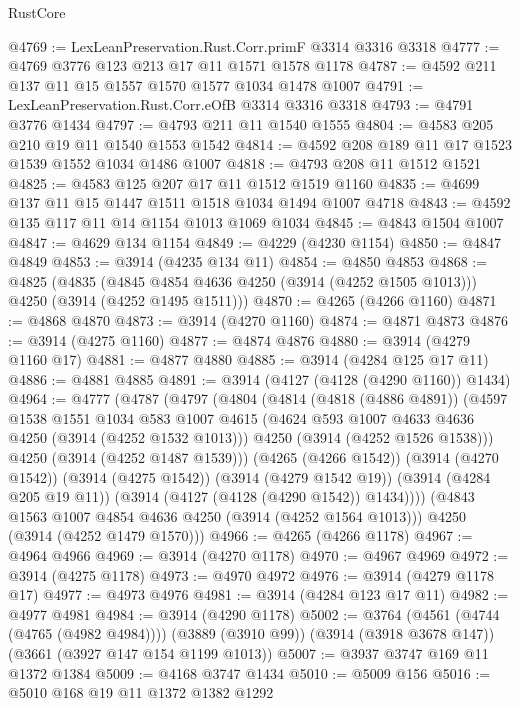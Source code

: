 \begin{lexlean}{RustCore}
\begin{coremodule}
@4769 := LexLeanPreservation.Rust.Corr.primF @3314 @3316 @3318
@4777 := @4769 @3776 @123 @213 @17 @11 @1571 @1578 @1178
@4787 := @4592 @211 @137 @11 @15 @1557 @1570 @1577 @1034 @1478 @1007
@4791 := LexLeanPreservation.Rust.Corr.eOfB @3314 @3316 @3318
@4793 := @4791 @3776 @1434
@4797 := @4793 @211 @11 @1540 @1555
@4804 := @4583 @205 @210 @19 @11 @1540 @1553 @1542
@4814 := @4592 @208 @189 @11 @17 @1523 @1539 @1552 @1034 @1486 @1007
@4818 := @4793 @208 @11 @1512 @1521
@4825 := @4583 @125 @207 @17 @11 @1512 @1519 @1160
@4835 := @4699 @137 @11 @15 @1447 @1511 @1518 @1034 @1494 @1007 @4718
@4843 := @4592 @135 @117 @11 @14 @1154 @1013 @1069 @1034
@4845 := @4843 @1504 @1007
@4847 := @4629 @134 @1154
@4849 := @4229 (@4230 @1154)
@4850 := @4847 @4849
@4853 := @3914 (@4235 @134 @11)
@4854 := @4850 @4853
@4868 := @4825
    (@4835 (@4845 @4854 @4636 @4250 (@3914 (@4252 @1505 @1013))) @4250 (@3914 (@4252 @1495 @1511)))
@4870 := @4265 (@4266 @1160)
@4871 := @4868 @4870
@4873 := @3914 (@4270 @1160)
@4874 := @4871 @4873
@4876 := @3914 (@4275 @1160)
@4877 := @4874 @4876
@4880 := @3914 (@4279 @1160 @17)
@4881 := @4877 @4880
@4885 := @3914 (@4284 @125 @17 @11)
@4886 := @4881 @4885
@4891 := @3914 (@4127 (@4128 (@4290 @1160)) @1434)
@4964 := @4777
    (@4787
      (@4797
        (@4804
          (@4814
            (@4818 (@4886 @4891))
            (@4597
              @1538
              @1551
              @1034
              @583
              @1007
              @4615
              (@4624 @593 @1007 @4633 @4636 @4250 (@3914 (@4252 @1532 @1013)))
              @4250
              (@3914 (@4252 @1526 @1538)))
            @4250
            (@3914 (@4252 @1487 @1539)))
          (@4265 (@4266 @1542))
          (@3914 (@4270 @1542))
          (@3914 (@4275 @1542))
          (@3914 (@4279 @1542 @19))
          (@3914 (@4284 @205 @19 @11))
          (@3914 (@4127 (@4128 (@4290 @1542)) @1434))))
      (@4843 @1563 @1007 @4854 @4636 @4250 (@3914 (@4252 @1564 @1013)))
      @4250
      (@3914 (@4252 @1479 @1570)))
@4966 := @4265 (@4266 @1178)
@4967 := @4964 @4966
@4969 := @3914 (@4270 @1178)
@4970 := @4967 @4969
@4972 := @3914 (@4275 @1178)
@4973 := @4970 @4972
@4976 := @3914 (@4279 @1178 @17)
@4977 := @4973 @4976
@4981 := @3914 (@4284 @123 @17 @11)
@4982 := @4977 @4981
@4984 := @3914 (@4290 @1178)
@5002 := @3764
    (@4561 (@4744 (@4765 (@4982 @4984))))
    (@3889 (@3910 @99))
    (@3914 (@3918 @3678 @147))
    (@3661 (@3927 @147 @154 @1199 @1013))
@5007 := @3937 @3747 @169 @11 @1372 @1384
@5009 := @4168 @3747 @1434
@5010 := @5009 @156
@5016 := @5010 @168 @19 @11 @1372 @1382 @1292

\end{coremodule}
\end{lexlean}
